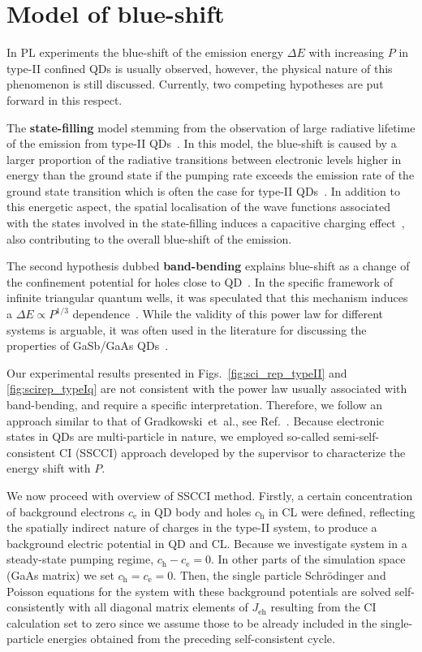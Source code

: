 \section{Model of blue-shift}\label{sec:scirep_pumpingmodel}
In PL experiments the blue-shift of the emission energy $\Delta E$ with increasing $P$ in type-II confined QDs is usually observed, however, the physical nature of this phenomenon is still discussed. Currently, two competing hypotheses are put forward in this respect.

The \textbf{state-filling} model stemming from the observation of large radiative lifetime of the emission from type-II QDs~\citep{Liao2009,Nishikawa2012,Sato2012,Pavarelli2012,Young2014}. In this model, the blue-shift is caused by a larger proportion of the radiative transitions between electronic levels higher in energy than the ground state if the pumping rate exceeds the emission rate of the ground state transition which is often the case for type-II QDs~\citep{Gradkowski2012}. In addition to this energetic aspect, the spatial localisation of the wave functions associated with the states involved in the state-filling induces a capacitive charging effect~\citep{Muller-Kirsch2001}, also contributing to the overall blue-shift of the emission.


The second hypothesis dubbed \textbf{band-bending} explains blue-shift as a change of the confinement potential for holes close to QD~\citep{LiuSteer,Jin,Hatami1998,Jo2012}. In the specific framework of infinite triangular quantum wells, it was speculated that this mechanism induces a $\Delta E \propto P^{1/3}$ dependence~\cite{Ledentsov1995,Kuokstis2002,Jo2012}. While the validity of this power law for different systems is arguable, it was often used in the literature for discussing the properties of GaSb/GaAs QDs~\cite{HATAMI1995,Hatami1998}.

Our experimental results presented in Figs.~\ref{fig:sci_rep_typeII} and \ref{fig:scirep_typeIq} are not consistent with the power law usually associated with band-bending, and require a specific interpretation. Therefore, we follow an approach similar to that of Gradkowski{~et~al}., see Ref.~\citep{Gradkowski2012}. Because electronic states in QDs are multi-particle in nature, we employed so-called semi-self-consistent CI (SSCCI) approach developed by the supervisor to characterize the energy shift with $P$.

We now proceed with overview of SSCCI method. Firstly, a certain concentration of background electrons $c_\mathrm{e}$ in QD body and holes $c_\mathrm{h}$ in CL were defined, reflecting the spatially indirect nature of charges in the type-II system, to produce a background electric potential in QD and CL. Because we investigate system in a steady-state pumping regime, $c_\mathrm{h}-c_\mathrm{e}=0$. In other parts of the simulation space (GaAs matrix) we set $c_\mathrm{h}=c_\mathrm{e}=0$. Then, the single particle Schrödinger and Poisson equations for the system with these background potentials are solved self-consistently with all diagonal matrix elements of $J_\mathrm{eh}$ resulting from the CI calculation set to zero since we assume those to be already included in the single-particle energies obtained from the preceding self-consistent cycle.

